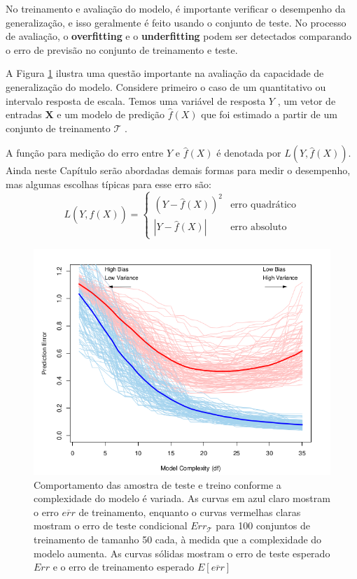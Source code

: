 No treinamento e avaliação do modelo, é importante verificar o desempenho da generalização, e isso geralmente é feito usando o conjunto de teste. No processo de avaliação, o \textbf{overfitting} e o \textbf{underfitting} podem ser detectados comparando o erro de previsão no conjunto de treinamento e teste.

A Figura \ref{fig:bias_variance_comp} ilustra uma questão importante na avaliação da capacidade de generalização do modelo. Considere primeiro o caso de um quantitativo ou intervalo resposta de escala. Temos uma variável de resposta $Y$ , um vetor de entradas $\mathbf{X}$ e um modelo de predição $\hat{f}(X)$ que foi estimado a partir de um conjunto de treinamento $\mathcal{T}$ . 

A função para medição do erro entre $Y$ e $\hat{f}(X)$ é denotada por $L(Y,\hat{f}(X))$. Ainda neste Capítulo serão abordadas demais formas para medir o desempenho, mas algumas escolhas típicas para esse erro são:
\begin{equation}
  L(Y,\hat{f}(X)) =
    \begin{cases}
      {(Y - \hat{f}(X))}^2 & \text{erro quadrático}\\
      |Y - \hat{f}(X)| & \text{erro absoluto}
    \end{cases}       
\end{equation}

\begin{figure}[htb]
 \caption{Comportamento das amostra de teste e treino conforme a complexidade do modelo é variada. As curvas em azul claro mostram o erro $\overline{err}$ de treinamento, enquanto o
curvas vermelhas claras mostram o erro de teste condicional $Err_{\mathcal{T}}$ para 100 conjuntos de treinamento de tamanho 50 cada, à medida que a complexidade do modelo aumenta. As curvas sólidas mostram o  erro de teste esperado $Err$ e o erro de treinamento esperado $E[\overline{err}]$ \cite{hastie}
}
 \label{fig:bias_variance_comp}
 \centering
 \includegraphics[scale=0.5]{images/bias_viariance.png}
\end{figure}

